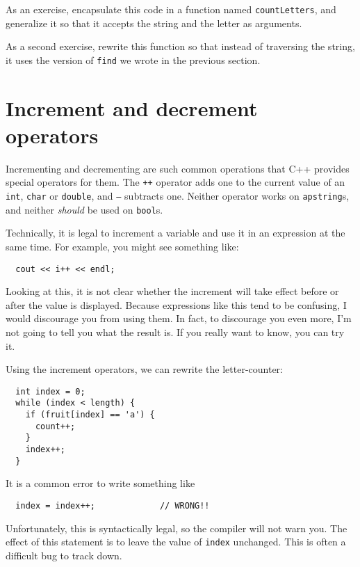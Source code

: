 
As an exercise, encapsulate this code in a function named
{\tt countLetters}, and generalize it so that it accepts the
string and the letter as arguments.


As a second exercise, rewrite this function so that instead
of traversing the string, it uses the version of
{\tt find} we wrote in the previous section.

\section{Increment and decrement operators}

Incrementing and decrementing are such common operations that C++
provides special operators for them.  The {\tt ++} operator adds one
to the current value of an {\tt int}, {\tt char} or {\tt double}, and
{\tt --} subtracts one.  Neither operator works on {\tt apstring}s,
and neither {\em should} be used on {\tt bool}s.

Technically, it is legal to increment a variable and use it
in an expression at the same time.  For example, you might see
something like:

\begin{verbatim}
  cout << i++ << endl;
\end{verbatim}
%
Looking at this, it is not clear whether the increment will
take effect before or after the value is displayed.  Because
expressions like this tend to be confusing, I would discourage
you from using them.  In fact, to discourage you even more,
I'm not going to tell you what the result is.  If you really
want to know, you can try it.

Using the increment operators, we can rewrite the letter-counter:

\begin{verbatim}
  int index = 0;
  while (index < length) {
    if (fruit[index] == 'a') {
      count++;
    }
    index++;
  }
\end{verbatim}
%
It is a common error to write something like

\begin{verbatim}
  index = index++;             // WRONG!!
\end{verbatim}
%
Unfortunately, this is syntactically legal, so the compiler
will not warn you.  The effect of this statement is to leave
the value of {\tt index} unchanged.  This is often a difficult
bug to track down.

